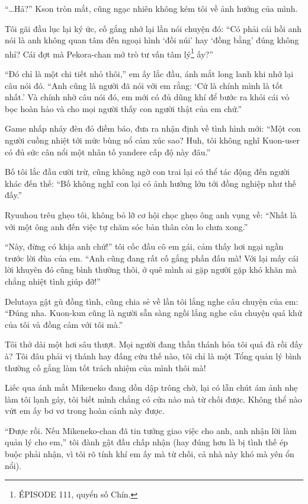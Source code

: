 ﻿\documentclass[../main.tex]{subfiles}
\begin{document}
``\dots Hả?'' Kson tròn mắt, cũng ngạc nhiên không kém tôi về ảnh hưởng của mình.

Tôi gãi đầu lục lại ký ức, cố gắng nhớ lại lần nói chuyện đó: ``Có phải cái hồi anh nói là anh không quan tâm đến ngoại hình `đồi núi' hay `đồng bằng' đúng không nhỉ? Cái đợt mà Pekora-chan mở trò tư vấn tâm lý\footnote{{\flaregothic ÉPISODE 111}, quyển số Chín.} ấy?''

``Đó chỉ là một chi tiết nhỏ thôi,'' em ấy lắc đầu, ánh mắt long lanh khi nhớ lại câu nói đó. ``Anh cũng là người đã nói với em rằng: `Cứ là chính mình là tốt nhất.' Và chính nhờ câu nói đó, em mới có đủ dũng khí để bước ra khỏi cái vỏ bọc hoàn hảo và cho mọi người thấy con người thật của em chứ.''

Game nhấp nháy đèn đỏ điềm báo, đưa ra nhận định về tình hình mới: ``Một con người cuồng nhiệt tới mức bùng nổ cảm xúc sao? Huh, tôi không nghĩ Kuon-user có đủ sức cân nổi một nhân tố yandere cấp độ này đâu.''

Bố tôi lắc đầu cười trừ, cũng không ngờ con trai lại có thể tác động đến người khác đến thế: ``Bố không nghĩ con lại có ảnh hưởng lớn tới đồng nghiệp như thế đấy.''

Ryuuhou trêu ghẹo tôi, không bỏ lỡ cơ hội chọc ghẹo ông anh vụng về: ``Nhất là với một ông anh đến việc tự chăm sóc bản thân còn lo chưa xong.''

``Này, đừng có khịa anh chứ!'' tôi cốc đầu cô em gái, cảm thấy hơi ngại ngần trước lời đùa của em. ``Anh cũng đang rất cố gắng phấn đấu mà! Với lại mấy cái lời khuyên đó cũng bình thường thôi, ở quê mình ai gặp người gặp khó khăn mà chẳng nhiệt tình giúp đỡ!''

Delutaya gật gù đồng tình, cũng chia sẻ về lần tôi lắng nghe câu chuyện của em: ``Đúng nha. Kuon-kun cũng là người sẵn sàng ngồi lắng nghe câu chuyện quá khứ của tôi và đồng cảm với tôi mà.''

Tôi thở dài một hơi sâu thượt. Mọi người đang thần thánh hóa tôi quá đà rồi đấy à? Tôi đâu phải vị thánh hay đấng cứu thế nào, tôi chỉ là một Tổng quản lý bình thường cố gắng làm tốt trách nhiệm của mình thôi mà!

Liếc qua ánh mắt Mikeneko đang dồn dập trông chờ, lại có lẫn chút ám ảnh nhẹ làm tôi lạnh gáy, tôi biết mình chẳng có cửa nào mà từ chối được. Không thể nào vứt em ấy bơ vơ trong hoàn cảnh này được.

``Được rồi. Nếu Mikeneko-chan đã tin tưởng giao việc cho anh, anh nhận lời làm quản lý cho em,'' tôi đành gật đầu chấp nhận (hay đúng hơn là bị tình thế ép buộc phải nhận, vì tôi rõ tính khí em ấy mà từ chối, cả nhà này khó mà yên ổn nổi).
\end{document}
